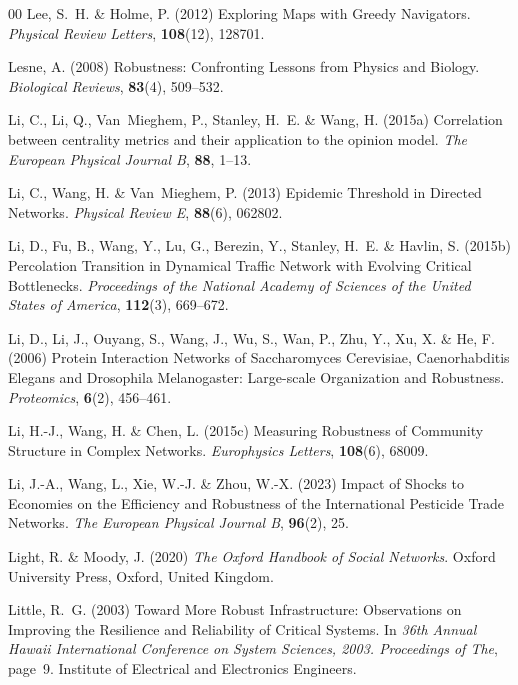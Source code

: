 \documentclass{comnet-mod}
\begin{document}
\begin{thebibliography}{00}
Lee, S.~H. {\&} Holme, P. (2012)  {Exploring Maps with Greedy Navigators}. {\em
  {Physical Review Letters}}, \textbf{108}(12), 128701.

Lesne, A. (2008)  {Robustness: {{Confronting}} Lessons from Physics and
  Biology}. {\em {Biological Reviews}}, \textbf{83}(4), 509--532.

Li, C., Li, Q., Van~Mieghem, P., Stanley, H.~E. {\&} Wang, H. (2015a)
  Correlation between centrality metrics and their application to the opinion
  model. {\em {The European Physical Journal B}}, \textbf{88}, 1--13.

Li, C., Wang, H. {\&} Van~Mieghem, P. (2013)  {Epidemic Threshold in Directed
  Networks}. {\em {Physical Review E}}, \textbf{88}(6), 062802.

Li, D., Fu, B., Wang, Y., Lu, G., Berezin, Y., Stanley, H.~E. {\&} Havlin, S.
  (2015b)  {Percolation Transition in Dynamical Traffic Network with Evolving
  Critical Bottlenecks}. {\em {Proceedings of the National Academy of Sciences
  of the United States of America}}, \textbf{112}(3), 669--672.

Li, D., Li, J., Ouyang, S., Wang, J., Wu, S., Wan, P., Zhu, Y., Xu, X. {\&} He,
  F. (2006)  {Protein Interaction Networks of {{Saccharomyces}} Cerevisiae,
  {{Caenorhabditis}} Elegans and {{Drosophila}} Melanogaster: {{Large-scale}}
  Organization and Robustness}. {\em {Proteomics}}, \textbf{6}(2), 456--461.

Li, H.-J., Wang, H. {\&} Chen, L. (2015c)  {Measuring Robustness of Community
  Structure in Complex Networks}. {\em {Europhysics Letters}}, \textbf{108}(6),
  68009.

Li, J.-A., Wang, L., Xie, W.-J. {\&} Zhou, W.-X. (2023)  {Impact of Shocks to
  Economies on the Efficiency and Robustness of the International Pesticide
  Trade Networks}. {\em {The European Physical Journal B}}, \textbf{96}(2), 25.

Light, R. {\&} Moody, J. (2020) {\em {The Oxford Handbook of Social Networks}}.
{Oxford University Press}, {Oxford, United Kingdom}.

Little, R.~G. (2003)  {Toward More Robust Infrastructure: {{Observations}} on
  Improving the Resilience and Reliability of Critical Systems}. In {\em {36th
  Annual Hawaii International Conference on System Sciences, 2003.
  {{Proceedings}} of The}}, page~9. {Institute of Electrical and Electronics
  Engineers}.


\end{thebibliography}
\end{document}
